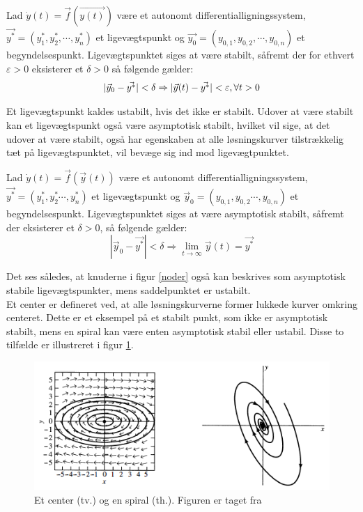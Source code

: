 \begin{definition}
Lad $\dot{y}(t)=\vec{f}(\vec{y(t)})$
være et autonomt differentialligningssystem, $\vec{y^*}=(y^*_{1},y^*_{2}, \cdots ,y^*_{n})$ et ligevægtspunkt og $\vec {y_0}=(y_{0,1},y_{0,2}, \cdots ,y_{0,n})$ et begyndelsespunkt. Ligevægtspunktet siges at være stabilt, såfremt der for ethvert $\varepsilon >0$ eksisterer et $\delta >0$ så følgende gælder:
$$|\vec y_0 - \vec {y^*}|< \delta \Rightarrow |\vec y(t) - \vec {y^*}| < \varepsilon, \\ \forall t > 0$$
\end{definition}
Et ligevægtspunkt kaldes ustabilt, hvis det ikke er stabilt.
Udover at være stabilt kan et ligevægtspunkt også være asymptotisk stabilt, hvilket vil sige, at det udover at være stabilt, også har egenskaben at alle løsningskurver tilstrækkelig tæt på ligevægtspunktet, vil bevæge sig ind mod ligevægtpunktet.

\begin{definition}
Lad 
$\dot{y}(t) = \vec{f}(\vec{y}(t))$
være et autonomt differentialligningssystem, $\vec {y^*}=(y_1^*,y_2^* \cdots ,y_n^*)$ et ligevægtspunkt og $\vec y_0=(y_{0,1},y_{0,2} \cdots ,y_{0,n})$ et begyndelsespunkt. Ligevægtspunktet siges at være asymptotisk stabilt, såfremt der eksisterer et $\delta >0$, så følgende gælder:
$$|\vec y_0 - \vec {y^*}|< \delta \Rightarrow \lim_{t\to\infty} \vec y(t)= \vec {y^*}$$
\end{definition}
Det ses således, at knuderne i figur \ref{noder} også kan beskrives som asymptotisk stabile ligevægtspunkter, mens saddelpunktet er ustabilt. \\
Et center er defineret ved, at alle løsningskurverne former lukkede kurver omkring centeret. Dette er et eksempel på et stabilt punkt, som ikke er asymptotisk stabilt, mens en spiral kan være enten asymptotisk stabil eller ustabil. Disse to tilfælde er illustreret i figur \ref{center}.

\begin{figure} [H]
    \centering
    \includegraphics{Images/center.png}
    \caption{Et center (tv.) og en spiral (th.). Figuren er taget fra \citep[s. 493-495]{EP}}
    \label{center}
\end{figure}

